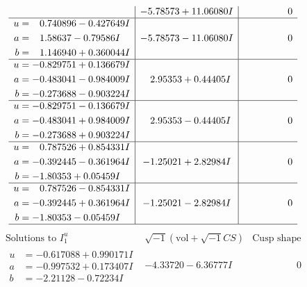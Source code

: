\documentclass[1p]{elsarticle_modified}
\theoremstyle{definition}
\newcommand{\I}{\sqrt{-1}}
\begin{document}
$$\begin{array}{c|c|c}
 & -5.78573 + 11.06080 I & \phantom{-0.000000 } 0 \\ \hline\begin{aligned}
u &= \phantom{-}0.740896 - 0.427649 I \\
a &= \phantom{-}1.58637 - 0.79586 I \\
b &= \phantom{-}1.146940 + 0.360044 I\end{aligned}
 & -5.78573 - 11.06080 I & \phantom{-0.000000 } 0 \\ \hline\begin{aligned}
u &= -0.829751 + 0.136679 I \\
a &= -0.483041 - 0.984009 I \\
b &= -0.273688 - 0.903224 I\end{aligned}
 & \phantom{-}2.95353 + 0.44405 I & \phantom{-0.000000 } 0 \\ \hline\begin{aligned}
u &= -0.829751 - 0.136679 I \\
a &= -0.483041 + 0.984009 I \\
b &= -0.273688 + 0.903224 I\end{aligned}
 & \phantom{-}2.95353 - 0.44405 I & \phantom{-0.000000 } 0 \\ \hline\begin{aligned}
u &= \phantom{-}0.787526 + 0.854331 I \\
a &= -0.392445 - 0.361964 I \\
b &= -1.80353 + 0.05459 I\end{aligned}
 & -1.25021 + 2.82984 I & \phantom{-0.000000 } 0 \\ \hline\begin{aligned}
u &= \phantom{-}0.787526 - 0.854331 I \\
a &= -0.392445 + 0.361964 I \\
b &= -1.80353 - 0.05459 I\end{aligned}
 & -1.25021 - 2.82984 I & \phantom{-0.000000 } 0\\
 \hline 
 \end{array}$$\newpage$$\begin{array}{c|c|c}  
\text{Solutions to }I^u_{1}& \I (\text{vol} + \sqrt{-1}CS) & \text{Cusp shape}\\
 \hline 
\begin{aligned}
u &= -0.617088 + 0.990171 I \\
a &= -0.997532 + 0.173407 I \\
b &= -2.21128 - 0.72234 I\end{aligned}
 & -4.33720 - 6.36777 I & \phantom{-0.000000 } 0 \\ \hline\begin{aligned}

\end{aligned}
\end{array}$$
\end{document}
